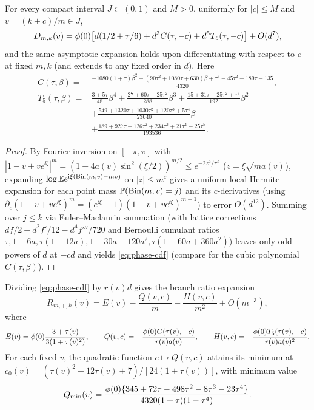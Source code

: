 \begin{lemma}\label{lem:phase-uniform}
For every compact interval $J\subset(0,1)$ and $M>0$, uniformly for
$|c|\le M$ and $v=(k+c)/m\in J$,
\begin{equation}\label{eq:phase-cdf}
 D_{m,k}(v)=\phi(0)\bigl[d(1/2+\tau/6)+d^3C(\tau,-c)
                         +d^5T_5(\tau,-c)\bigr]+O(d^7),
\end{equation}
and the same asymptotic expansion holds upon differentiating with respect to
$c$ at fixed $m,k$ (and extends to any fixed order in $d$). Here
\begin{align*}
C(\tau,\beta)={}&\frac{-1080(1+\tau)\beta^2
 -(90\tau^2+1080\tau+630)\beta
 +\tau^3-45\tau^2-189\tau-135}{4320},\\
T_5(\tau,\beta)={}&\frac{3+5\tau}{48}\beta^4
 +\frac{27+60\tau+25\tau^2}{288}\beta^3
 +\frac{15+31\tau+25\tau^2+\tau^3}{192}\beta^2\\
&+\frac{549+1320\tau+1030\tau^2+120\tau^3+5\tau^4}{23040}\beta\\
 &+\frac{189+927\tau+126\tau^2+234\tau^3+21\tau^4-25\tau^5}{193536}.
\end{align*}
\end{lemma}

\begin{proof}
By Fourier inversion on $[-\pi,\pi]$ with $|1-v+ve^{\ii\xi}|^m=(1-4a(v)\sin^2(\xi/2))^{m/2}\le e^{-2z^2/\pi^2}$
($z=\xi\sqrt{ma(v)}$), expanding $\log\mathbb E e^{\mathrm i\xi(\operatorname{Bin}(m,v)-mv)}$ on
$|z|\le m^\varepsilon$ gives a uniform local Hermite expansion for each point
mass $\mathbb P(\operatorname{Bin}(m,v)=j)$ and its $c$-derivatives (using
$\partial_c(1-v+ve^{\ii\xi})^m=(e^{\ii\xi}-1)(1-v+ve^{\ii\xi})^{m-1}$) to
error $O(d^{12})$. Summing over $j\le k$ via Euler--Maclaurin summation
(with lattice corrections $df/2+d^2f'/12-d^4f'''/720$ and Bernoulli cumulant
ratios $\tau,1-6a,\tau(1-12a),1-30a+120a^2,\tau(1-60a+360a^2)$) leaves only
odd powers of $d$ at $-cd$ and yields \eqref{eq:phase-cdf} (compare
\citet[Remark~4.3, p.~25]{Schulz2016} for the cubic polynomial $C(\tau,\beta)$).
\end{proof}

Dividing \eqref{eq:phase-cdf} by $r(v)d$ gives the branch ratio expansion
\begin{equation}\label{eq:phase-efficiency}
 R_{m,+,k}(v)=E(v)-\frac{Q(v,c)}m-\frac{H(v,c)}{m^2}+O(m^{-3}),
\end{equation}
where
\[
 E(v)=\phi(0)\frac{3+\tau(v)}{3(1+\tau(v)^2)},\qquad
 Q(v,c)=-\frac{\phi(0) C(\tau(v),-c)}{r(v)a(v)},\qquad
 H(v,c)=-\frac{\phi(0) T_5(\tau(v),-c)}{r(v)a(v)^2}.
\]
For each fixed $v$, the quadratic function $c\mapsto Q(v,c)$ attains its
minimum at $c_0(v)=(\tau(v)^2+12\tau(v)+7)/[24(1+\tau(v))]$, with minimum
value
\begin{equation}\label{eq:phase-qmin}
 Q_{\min}(v)=\frac{\phi(0)\{345+72\tau-498\tau^2-8\tau^3-23\tau^4\}}
 {4320(1+\tau)(1-\tau^4)}.
\end{equation}

